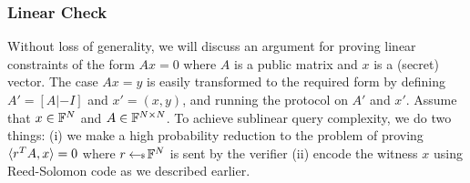 \begin{comment}
	Now $\extrac$ checks computes $d(\calU^*, L^m)$. Probability that $d(\calU^*,L^m) > e$ is $\negl(\lambda)$, by soundness analysis in \cite{Ligero2017}.
	
	Therefore $\extrac$ outputs $\calU^*$ whcih satisfies $\com(\calU^*) = \cm$ such that $d(\calU^*, L^m) < e$ with very high probability or it breaks the binding of the commitment scheme.
	
	Now we need to prove that the number of rewinding is polynomial.
	
	To get the bound on the expected number of rewindings consider $t=1$. 
	
	Let $X$ be the discrete random variable that represents the number of purchases until each of the $n$ column is picked at least once.
	
	Let $X_i$ be the discrete random variable that represents the number of rewindings after the $(i-1)^{th}$ distinct column to select the $i^{th}$ distinct column. As a base case, $X_1=1$, because the first column selected will always be distinct.
	
	By Linearity of expectation, $E[X]=\sum_{i=1}^{n}E[X_i]$
	
	After the $(i-1)^{th}$ distinct column is picked, there are $n-i+1$ columns remaining to be picked. Let $A_i$ be the event that one of those columns is picked in the next rewinding. Then $Pr(A_i)=\frac{n-i+1}{n}$.
	
	$X_i$ follows a geometric distribution (of trials). It's expected value is
	$$E[X_i]= \frac{1}{Pr(A_i)} = \frac{n}{n-i+1}$$
	From before, $E[X]$ is equal to the sum of all these expectations: i.e.
	$$E[X] = \sum\limits_{i=1}^{n} \frac{n}{n-i+1} = n\sum\limits_{i=1}^{n} \frac{1}{i} \approx n \log n$$
	Which is polynomial in $n$ and so polynomial in security parameter.
\end{proof}
\end{comment}


\subsubsection{Linear Check}
	Without loss of generality, we will discuss an argument for proving linear constraints of the form $Ax=0$ where $A$ is a public matrix and $x$ is a (secret) vector. The case $Ax=y$ is easily transformed to the required form by defining $A'=[A|-I]$ and $x'=(x,y)$, and running the protocol on $A'$ and $x'$. Assume that $x\in \mathbb{F}^N$ and $A\in \mathbb{F}^{N\times N}$. To achieve sublinear query complexity, we do two things: (i) we make a high probability reduction to the problem of proving $\langle r^TA,x\rangle=0$ where $r\hskip2.3pt{\gets\!\!\mbox{\tiny${\$}$\normalsize}}\, \mathbb{F}^N$ is sent by the verifier (ii) encode the witness $x$ using Reed-Solomon code as we described earlier.
	
